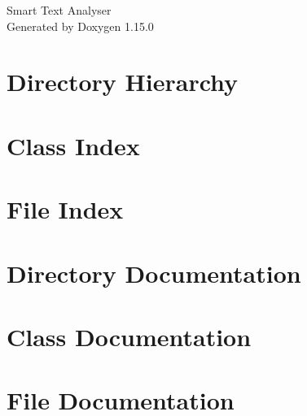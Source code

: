 \documentclass[twoside]{book}
\newcommand{\+}{\discretionary{\mbox{\scriptsize$\hookleftarrow$}}{}{}}
\newcommand{\clearemptydoublepage}{%
    \newpage{\pagestyle{empty}\cleardoublepage}%
  }
\begin{document}
  \raggedbottom
    \hypersetup{pageanchor=false,
                bookmarksnumbered=true,
                pdfencoding=unicode
               }
  \begin{titlepage}
  \vspace*{7cm}
  \begin{center}%
  {\Large Smart Text Analyser}\\
  \vspace*{1cm}
  {\large Generated by Doxygen 1.15.0}\\
  \end{center}
  \end{titlepage}
  \clearemptydoublepage
  \tableofcontents
  \clearemptydoublepage
  \hypersetup{pageanchor=true}
\chapter{Directory Hierarchy}

\chapter{Class Index}

\chapter{File Index}

\chapter{Directory Documentation}




\chapter{Class Documentation}




\chapter{File Documentation}




















  \backmatter
  \newpage
  \clearemptydoublepage
  \printindex
\end{document}
